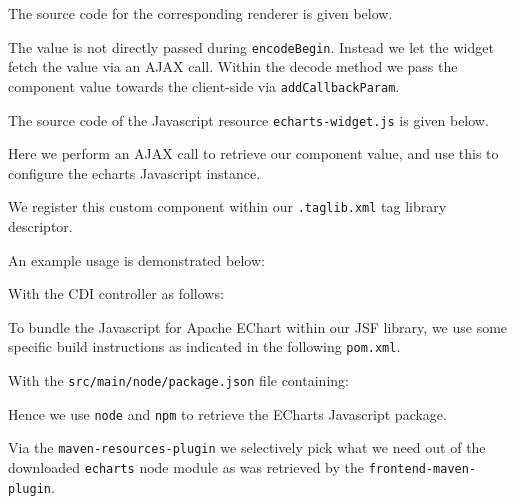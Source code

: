 The source code for the corresponding renderer is given below.

The value is not directly passed during \texttt{encodeBegin}.
Instead we let the widget fetch the value via an AJAX call.
Within the decode method we pass the component value towards the client-side via \texttt{addCallbackParam}.

The source code of the Javascript resource \texttt{echarts-widget.js} is given below.

Here we perform an AJAX call to retrieve our component value, and use this to configure the echarts Javascript instance.

We register this custom component within our \texttt{.taglib.xml} tag library descriptor.


An example usage is demonstrated below:


With the CDI controller as follows:


To bundle the Javascript for Apache EChart within our JSF library, we use some specific build instructions as indicated in the following \texttt{pom.xml}.

With the \texttt{src/main/node/package.json} file containing:

Hence we use \texttt{node} and \texttt{npm} to retrieve the ECharts Javascript package.

Via the \texttt{maven-resources-plugin} we selectively pick what we need out of the downloaded \texttt{echarts} node module as was retrieved by the \texttt{frontend-maven-plugin}.